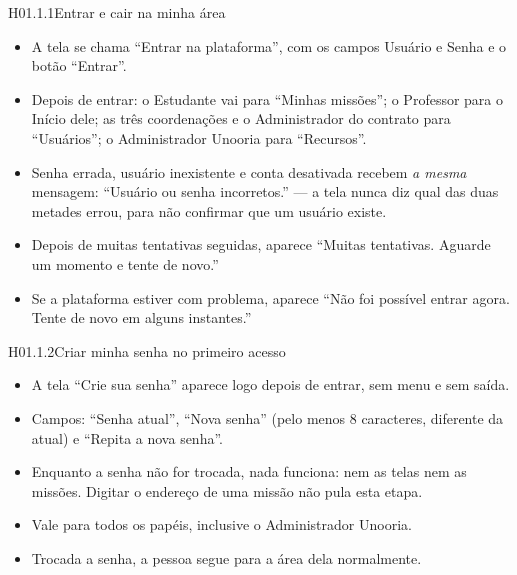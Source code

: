 \begin{historia}{H01.1.1}{Entrar e cair na minha área}{\pronto}
\aceite
\begin{itemize}
  \item A tela se chama \enquote{Entrar na plataforma}, com os campos Usuário
    e Senha e o botão \enquote{Entrar}.
  \item Depois de entrar: o Estudante vai para \enquote{Minhas missões}; o
    Professor para o Início dele; as três coordenações e o Administrador do
    contrato para \enquote{Usuários}; o Administrador Unooria para
    \enquote{Recursos}.
  \item Senha errada, usuário inexistente e conta desativada recebem
    \emph{a mesma} mensagem: \enquote{Usuário ou senha incorretos.} --- a tela
    nunca diz qual das duas metades errou, para não confirmar que um usuário
    existe.
  \item Depois de muitas tentativas seguidas, aparece \enquote{Muitas
    tentativas. Aguarde um momento e tente de novo.}
  \item Se a plataforma estiver com problema, aparece \enquote{Não foi possível
    entrar agora. Tente de novo em alguns instantes.}
\end{itemize}
\end{historia}

\begin{historia}{H01.1.2}{Criar minha senha no primeiro acesso}{\pronto}
\aceite
\begin{itemize}
  \item A tela \enquote{Crie sua senha} aparece logo depois de entrar, sem menu
    e sem saída.
  \item Campos: \enquote{Senha atual}, \enquote{Nova senha} (pelo menos 8
    caracteres, diferente da atual) e \enquote{Repita a nova senha}.
  \item Enquanto a senha não for trocada, nada funciona: nem as telas nem as
    missões. Digitar o endereço de uma missão não pula esta etapa.
  \item Vale para todos os papéis, inclusive o Administrador Unooria.
  \item Trocada a senha, a pessoa segue para a área dela normalmente.
\end{itemize}
\end{historia}

